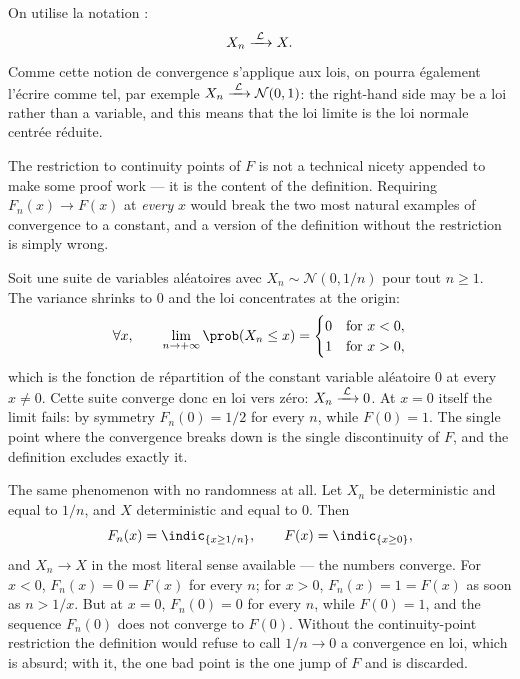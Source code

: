 \begin{notation}
  On utilise la notation :
  \[
    X_{n} \xrightarrow{\;\mathcal{L}\;} X .
  \]
  Comme cette notion de convergence s'applique aux lois, on pourra également
  l'écrire comme tel, par exemple $X_{n} \xrightarrow{\;\mathcal{L}\;} \mathcal{N}(0,1)$: the right-hand
  side may be a loi rather than a variable, and this means that the loi limite
  is the loi normale centrée réduite.
\end{notation}

The restriction to continuity points of $F$ is not a technical nicety appended
to make some proof work --- it is the content of the definition. Requiring
$F_{n}(x) \to F(x)$ at \emph{every} $x$ would break the two most natural
examples of convergence to a constant, and a version of the definition without
the restriction is simply wrong.

\begin{example}
  Soit une suite de variables aléatoires avec $X_{n} \sim \mathcal{N}(0, 1/n)$
  pour tout $n \geq 1$. The variance shrinks to $0$ and the loi concentrates at
  the origin:
  \[
    \forall x, \qquad \lim_{n \to +\infty} \prob(X_{n} \leq x) =
      \begin{cases}
        0 & \text{for } x < 0 , \\
        1 & \text{for } x > 0 ,
      \end{cases}
  \]
  which is the fonction de répartition of the constant variable aléatoire
  $0$ at every $x \neq 0$. Cette suite converge donc en loi vers zéro:
  $X_{n} \xrightarrow{\;\mathcal{L}\;} 0$. At $x = 0$ itself the limit fails:
  by symmetry $F_{n}(0) = 1/2$ for every $n$, while $F(0) = 1$. The single point
  where the convergence breaks down is the single discontinuity of $F$, and the
  definition excludes exactly it.
\end{example}

\begin{example}
  The same phenomenon with no randomness at all. Let $X_{n}$ be deterministic and
  equal to $1/n$, and $X$ deterministic and equal to $0$. Then
  \[
    F_{n}(x) = \indic_{\{x \geq 1/n\}}, \qquad
    F(x) = \indic_{\{x \geq 0\}} ,
  \]
  and $X_{n} \to X$ in the most literal sense available --- the numbers converge.
  For $x < 0$, $F_{n}(x) = 0 = F(x)$ for every $n$; for $x > 0$,
  $F_{n}(x) = 1 = F(x)$ as soon as $n > 1/x$. But at $x = 0$,
  $F_{n}(0) = 0$ for every $n$, while $F(0) = 1$, and the sequence $F_{n}(0)$
  does not converge to $F(0)$. Without the continuity-point restriction the
  definition would refuse to call $1/n \to 0$ a convergence en loi, which is
  absurd; with it, the one bad point is the one jump of $F$ and is discarded.
\end{example}

